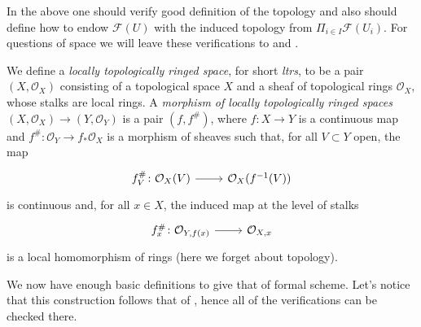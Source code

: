 \documentclass[../Main]{subfiles}
\begin{document}
\begin{rem}[]
	In the above one should verify good definition of the topology
	and also should define how to endow $\mathcal{F}(U)$
	with the induced topology from $\Pi_{i \in I} \mathcal{F}(U_i)$.
	For questions of space we will leave these verifications to
	\cite[\href{https://stacks.math.columbia.edu/tag/0AHY}{Section 0AHY}]{SP}
	and \cite[Chapter I, \S10]{EGA}.
\end{rem}


\begin{defn}
	We define a {\em locally topologically ringed space}, 
	for short {\em ltrs}, to be a pair
	$( X , \mathcal{O}_{ X } )$ consisting of a topological space $X$
	and a sheaf of topological rings $\mathcal{O}_X$,
	whose stalks are local rings.
	A {\em morphism of locally topologically ringed spaces}
	$( X , \mathcal{O}_{ X } ) \to  ( Y , \mathcal{O}_{ Y } )$
	is a pair $\left(f, f^\#\right)$,
	where $f\colon X \to Y$ is a continuous map
	and $f^\#\colon \mathcal{O}_Y \to f_* \mathcal{O}_X$ is
	a morphism of sheaves such that, for all $V \subset Y$ open,
	the map
	\begin{equation*}
	\begin{tikzcd}[row sep = 0ex
		,/tikz/column 1/.append style={anchor=base east}
		,/tikz/column 2/.append style={anchor=base west}]
		f^\#_V\colon \mathcal{O}_{ X }(V) \arrow[r, "", rightarrow] &
		\mathcal{O}_{ X }(f^{-1}(V))
	\end{tikzcd}
	\end{equation*} 
	is continuous and, for all $x \in X$, the induced map at the level
	of stalks
	\begin{equation*}
	\begin{tikzcd}[row sep = 0ex
		,/tikz/column 1/.append style={anchor=base east}
		,/tikz/column 2/.append style={anchor=base west}]
		f^\#_x\colon \mathcal{O}_{ Y,f(x) } \arrow[r, "", rightarrow] &
		\mathcal{O}_{ X,x }
	\end{tikzcd}
	\end{equation*} 
	is a local homomorphism of rings (here we forget about topology).
\end{defn}


\noindent
We now have enough basic definitions to give that of formal scheme.
Let's notice that this construction follows that of \cite[Chapter I, \S10]{EGA},
hence all of the verifications can be checked there.
\end{document}
